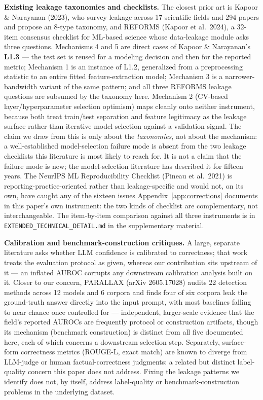 \documentclass[10pt]{article} %
\begin{document}
\textbf{Existing leakage taxonomies and checklists.} The closest prior art is
Kapoor \& Narayanan (2023), who survey leakage across 17 scientific fields and
294 papers and propose an 8-type taxonomy, and REFORMS (Kapoor et al.\ 2024), a
32-item consensus checklist for ML-based science whose data-leakage module asks
three questions. Mechanisms 4 and 5 are direct cases of Kapoor \& Narayanan's
\textbf{L1.3} --- the test set is reused for a modeling decision and then for
the reported metric; Mechanism 1 is an instance of L1.2, generalized from a
preprocessing statistic to an entire fitted feature-extraction model; Mechanism
3 is a narrower-bandwidth variant of the same pattern; and all three REFORMS
leakage questions are subsumed by the taxonomy here. Mechanism 2 (CV-based
layer/hyperparameter selection optimism) maps cleanly onto neither instrument,
because both treat train/test separation and feature legitimacy as the leakage
surface rather than iterative model selection against a validation signal. The
claim we draw from this is only about the \emph{taxonomies}, not about the
mechanism: a well-established model-selection failure mode is absent from the
two leakage checklists this literature is most likely to reach for. It is not a
claim that the failure mode is new; the model-selection literature has
described it for fifteen years. The NeurIPS ML Reproducibility Checklist
(Pineau et al.\ 2021) is reporting-practice-oriented rather than
leakage-specific and would not, on its own, have caught any of the sixteen
issues Appendix~\ref{app:corrections} documents in this paper's own instrument:
the two kinds of checklist are complementary, not interchangeable. The
item-by-item comparison against all three instruments is in
\texttt{EXTENDED\_TECHNICAL\_DETAIL.md} in the supplementary material.

\textbf{Calibration and benchmark-construction critiques.} A large, separate
literature asks whether LLM confidence is calibrated to correctness; that work
treats the evaluation protocol as given, whereas our contribution sits upstream
of it --- an inflated AUROC corrupts any downstream calibration analysis built
on it. Closer to our concern, PARALLAX (arXiv 2605.17028) audits 22 detection
methods across 12 models and 6 corpora and finds four of six corpora leak the
ground-truth answer directly into the input prompt, with most baselines falling
to near chance once controlled for --- independent, larger-scale evidence that
the field's reported AUROCs are frequently protocol or construction artifacts,
though its mechanism (benchmark construction) is distinct from all five
documented here, each of which concerns a downstream selection step.
Separately, surface-form correctness metrics (ROUGE-L, exact match) are known
to diverge from LLM-judge or human factual-correctness judgments: a related but
distinct label-quality concern this paper does not address. Fixing the leakage
patterns we identify does not, by itself, address label-quality or
benchmark-construction problems in the underlying dataset.
\end{document}
